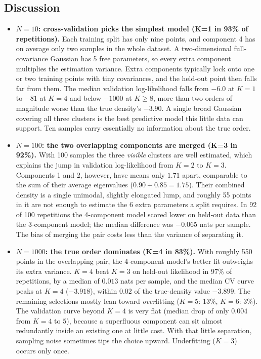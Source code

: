\documentclass[11pt]{article}
\begin{document}
\subsection*{Discussion}
\begin{itemize}
\item \textbf{$N=10$: cross-validation picks the simplest model (K=1 in 93\% of repetitions).} Each training split has only nine points, and component 4 has on average only two samples in the whole dataset. A two-dimensional full-covariance Gaussian has 5 free parameters, so every extra component multiplies the estimation variance. Extra components typically lock onto one or two training points with tiny covariances, and the held-out point then falls far from them. The median validation log-likelihood falls from $-6.0$ at $K=1$ to $-81$ at $K=4$ and below $-1000$ at $K\ge8$, more than two orders of magnitude worse than the true density's $-3.90$. A single broad Gaussian covering all three clusters is the best predictive model this little data can support. Ten samples carry essentially no information about the true order.
\item \textbf{$N=100$: the two overlapping components are merged (K=3 in 92\%).} With 100 samples the three \emph{visible} clusters are well estimated, which explains the jump in validation log-likelihood from $K=2$ to $K=3$. Components 1 and 2, however, have means only $1.71$ apart, comparable to the sum of their average eigenvalues ($0.90+0.85=1.75$). Their combined density is a single unimodal, slightly elongated lump, and roughly 55 points in it are not enough to estimate the 6 extra parameters a split requires. In 92 of 100 repetitions the 4-component model scored lower on held-out data than the 3-component model; the median difference was $-0.065$ nats per sample. The bias of merging the pair costs less than the variance of separating it.
\item \textbf{$N=1000$: the true order dominates (K=4 in 83\%).} With roughly 550 points in the overlapping pair, the 4-component model's better fit outweighs its extra variance. $K=4$ beat $K=3$ on held-out likelihood in 97\% of repetitions, by a median of $0.013$ nats per sample, and the median CV curve peaks at $K=4$ ($-3.918$), within $0.02$ of the true-density value $-3.899$. The remaining selections mostly lean toward \emph{over}fitting ($K=5$: 13\%, $K=6$: 3\%). The validation curve beyond $K=4$ is very flat (median drop of only $0.004$ from $K=4$ to $5$), because a superfluous component can sit almost redundantly inside an existing one at little cost. With that little separation, sampling noise sometimes tips the choice upward. Underfitting ($K=3$) occurs only once.

\end{itemize}
\end{document}
